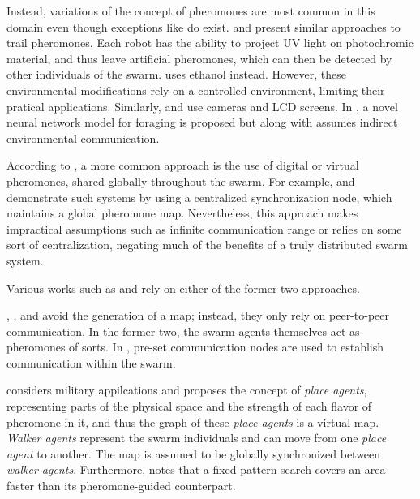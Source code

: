 \par Instead, variations of the concept of pheromones are most common in this domain even though exceptions like \parencite{flint_cooperative_2002} do exist. \parencite{salman_phormica_2020} and \parencite{hutchison_antbots_2010} present similar approaches to trail pheromones. Each robot has the ability to project UV light on photochromic material, and thus leave artificial pheromones, which can then be detected by other individuals of the swarm. \parencite{fujisawa_designing_2014} uses ethanol instead. However, these environmental modifications rely on a controlled environment, limiting their pratical applications. Similarly, \parencite{arvin_cos_nodate} and \parencite{na_bio-inspired_2021} use cameras and LCD screens. In \parencite{song_novel_2020}, a novel neural network model for foraging is proposed but along with \parencite{calvo_bio-inspired_2011} assumes indirect environmental communication.
\par According to \parencite{hunt_testing_2019}, a more common approach is the use of digital or virtual pheromones, shared globally throughout the swarm. For example, \parencite{winkelstrater_virtual_2019} and \parencite{ravankar_bio-inspired_2016} demonstrate such systems by using a centralized synchronization node, which maintains a global pheromone map. Nevertheless, this approach makes impractical assumptions such as infinite communication range or relies on some sort of centralization, negating much of the benefits of a truly distributed swarm system. 
\par Various works such as \parencite{fossum_repellent_2014} and \parencite{schroeder_efficient_2017} rely on either of the former two approaches.
\par \parencite{payton_pheromone_2001}, \parencite{pearce_using_2006}, and \parencite{schmickl_trophallaxis_2006} avoid the generation of a map; instead, they only rely on peer-to-peer communication. In the former two, the swarm agents themselves act as pheromones of sorts. In \parencite{li_pheromone-inspired_2019}, pre-set communication nodes are used to establish communication within the swarm.
\par \parencite{hutchison_digital_2005} considers military appilcations and proposes the concept of \textit{place agents}, representing parts of the physical space and the strength of each flavor of pheromone in it, and thus the graph of these \textit{place agents} is a virtual map. \textit{Walker agents} represent the swarm individuals and can move from one \textit{place agent} to another. The map is assumed to be globally synchronized between \textit{walker agents}. Furthermore, \parencite{sauter_performance_2005} notes that a fixed pattern search covers an area faster than its pheromone-guided counterpart. 
